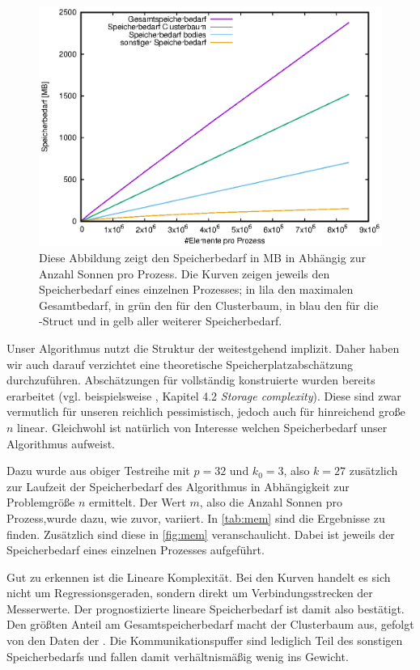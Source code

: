   
  \begin{figure}[b]
    \includegraphics{img/grav_32X_mem.eps}
    \caption{Diese Abbildung zeigt den Speicherbedarf in MB in Abhängig zur Anzahl Sonnen pro Prozess. Die Kurven zeigen jeweils den Speicherbedarf eines einzelnen Prozesses; in lila den maximalen 
    Gesamtbedarf, in grün den für den Clusterbaum, in blau den für die -Struct und in gelb aller weiterer Speicherbedarf.}
    \label{fig:mem}
  \end{figure}

  Unser Algorithmus nutzt die Struktur der \hquad weitestgehend implizit. Daher haben wir auch darauf verzichtet eine theoretische Speicherplatzabschätzung durchzuführen. Abschätzungen für vollständig
  konstruierte \hquad wurden bereits erarbeitet (vgl. beispielsweise \citet{distrh2}, Kapitel 4.2 \textit{Storage complexity}). Diese sind zwar vermutlich für unseren reichlich pessimistisch, jedoch
  auch für hinreichend große $n$ linear. Gleichwohl ist natürlich von Interesse welchen Speicherbedarf unser Algorithmus aufweist.
  
  Dazu wurde aus obiger Testreihe mit $p=32$ und $k_0=3$, also $k = 27$ zusätzlich zur Laufzeit der Speicherbedarf des Algorithmus in Abhängigkeit zur Problemgröße $n$ ermittelt. Der Wert $m$, also
  die Anzahl Sonnen pro Prozess,wurde dazu, wie zuvor, variiert. In \autoref{tab:mem} sind die Ergebnisse zu finden. Zusätzlich sind diese in \autoref{fig:mem} veranschaulicht. Dabei ist jeweils
  der Speicherbedarf eines einzelnen Prozesses aufgeführt. 
  
  Gut zu erkennen ist die Lineare Komplexität. Bei den Kurven handelt es sich nicht um Regressionsgeraden, sondern direkt um Verbindungsstrecken der Messerwerte. Der prognostizierte lineare 
  Speicherbedarf ist damit also bestätigt. Den größten Anteil am Gesamtspeicherbedarf macht der Clusterbaum aus, gefolgt von den Daten der . Die Kommunikationspuffer sind lediglich
  Teil des sonstigen Speicherbedarfs und fallen damit verhältnismäßig wenig ins Gewicht. 
  
